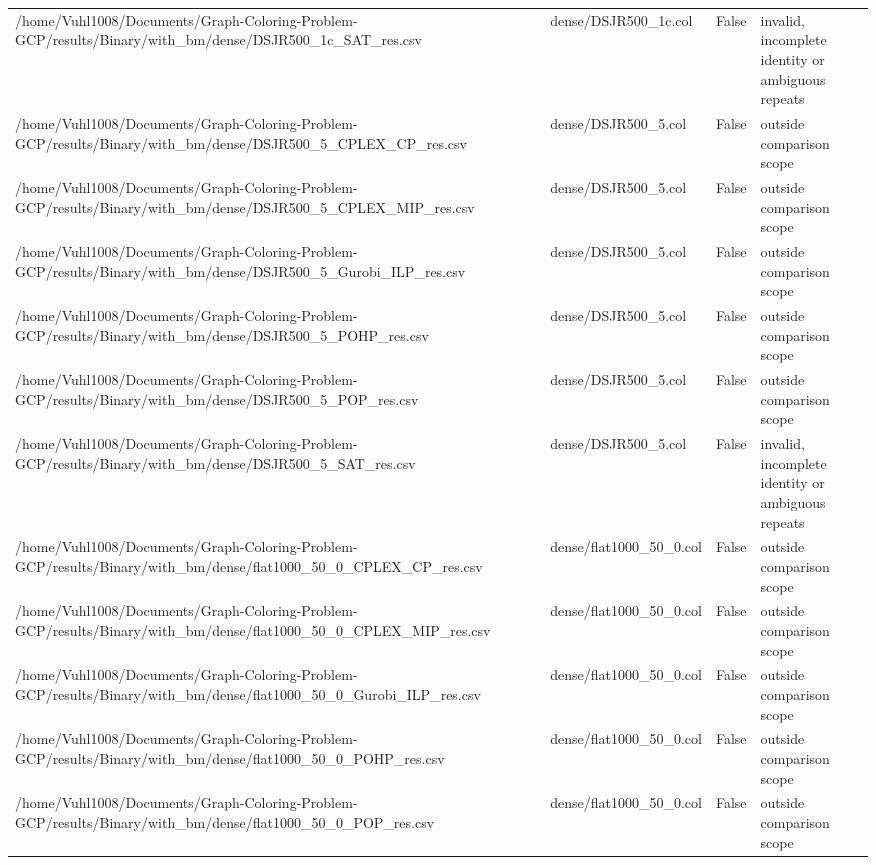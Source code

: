 \begin{table}[htbp]
\begin{tabular}{llll}
/home/Vuhl1008/Documents/Graph-Coloring-Problem-GCP/results/Binary/with\_bm/dense/DSJR500\_1c\_SAT\_res.csv & dense/DSJR500\_1c.col & False & invalid, incomplete identity or ambiguous repeats \\
/home/Vuhl1008/Documents/Graph-Coloring-Problem-GCP/results/Binary/with\_bm/dense/DSJR500\_5\_CPLEX\_CP\_res.csv & dense/DSJR500\_5.col & False & outside comparison scope \\
/home/Vuhl1008/Documents/Graph-Coloring-Problem-GCP/results/Binary/with\_bm/dense/DSJR500\_5\_CPLEX\_MIP\_res.csv & dense/DSJR500\_5.col & False & outside comparison scope \\
/home/Vuhl1008/Documents/Graph-Coloring-Problem-GCP/results/Binary/with\_bm/dense/DSJR500\_5\_Gurobi\_ILP\_res.csv & dense/DSJR500\_5.col & False & outside comparison scope \\
/home/Vuhl1008/Documents/Graph-Coloring-Problem-GCP/results/Binary/with\_bm/dense/DSJR500\_5\_POHP\_res.csv & dense/DSJR500\_5.col & False & outside comparison scope \\
/home/Vuhl1008/Documents/Graph-Coloring-Problem-GCP/results/Binary/with\_bm/dense/DSJR500\_5\_POP\_res.csv & dense/DSJR500\_5.col & False & outside comparison scope \\
/home/Vuhl1008/Documents/Graph-Coloring-Problem-GCP/results/Binary/with\_bm/dense/DSJR500\_5\_SAT\_res.csv & dense/DSJR500\_5.col & False & invalid, incomplete identity or ambiguous repeats \\
/home/Vuhl1008/Documents/Graph-Coloring-Problem-GCP/results/Binary/with\_bm/dense/flat1000\_50\_0\_CPLEX\_CP\_res.csv & dense/flat1000\_50\_0.col & False & outside comparison scope \\
/home/Vuhl1008/Documents/Graph-Coloring-Problem-GCP/results/Binary/with\_bm/dense/flat1000\_50\_0\_CPLEX\_MIP\_res.csv & dense/flat1000\_50\_0.col & False & outside comparison scope \\
/home/Vuhl1008/Documents/Graph-Coloring-Problem-GCP/results/Binary/with\_bm/dense/flat1000\_50\_0\_Gurobi\_ILP\_res.csv & dense/flat1000\_50\_0.col & False & outside comparison scope \\
/home/Vuhl1008/Documents/Graph-Coloring-Problem-GCP/results/Binary/with\_bm/dense/flat1000\_50\_0\_POHP\_res.csv & dense/flat1000\_50\_0.col & False & outside comparison scope \\
/home/Vuhl1008/Documents/Graph-Coloring-Problem-GCP/results/Binary/with\_bm/dense/flat1000\_50\_0\_POP\_res.csv & dense/flat1000\_50\_0.col & False & outside comparison scope \\

\end{tabular}
\end{table}
